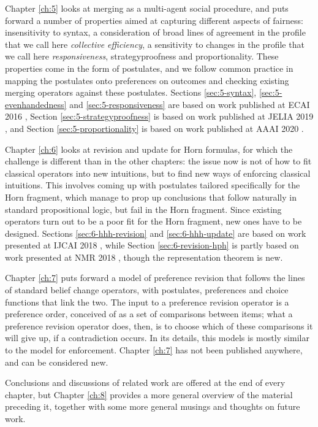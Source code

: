 Chapter \ref{ch:5} looks at merging as a multi-agent 
social procedure, and puts forward a number of properties
aimed at capturing different aspects of fairness:
insensitivity to syntax, 
a consideration of broad lines of agreement in the profile that we call here \emph{collective efficiency},
a sensitivity to changes in the profile that we call here \emph{responsiveness}, 
strategyproofness
and proportionality.
These properties come in the form of postulates, 
and we follow common practice in mapping the postulates 
onto preferences on outcomes and checking existing 
merging operators against these postulates.
Sections \ref{sec:5-syntax}, \ref{sec:5-evenhandedness} and \ref{sec:5-responsiveness}
are based on work published at ECAI 2016 \cite{HaretPW16}, 
Section \ref{sec:5-strategyproofness} is based on work published at JELIA 2019 \cite{HaretW19b},
and Section \ref{sec:5-proportionality} is based on work published at AAAI 2020 \cite{HaretLPW20}.

Chapter \ref{ch:6} looks at revision and update for Horn formulas,
for which the challenge is different than in the other chapters:
the issue now is not of how to fit classical operators into new intuitions,
but to find new ways of enforcing classical intuitions.
This involves coming up with postulates tailored specifically 
for the Horn fragment, which manage to prop up conclusions that 
follow naturally in standard propositional logic,
but fail in the Horn fragment.
Since existing operators turn out to be a poor fit 
for the Horn fragment, new ones have to be designed.
Sections \ref{sec:6-hhh-revision} and \ref{sec:6-hhh-update} 
are based on work presented 
at IJCAI 2018 \cite{CreignouHPW18},
while Section \ref{sec:6-revision-hph}
is partly based on work presented 
at NMR 2018 \cite{HaretW2018b}, 
though the representation theorem is new.

Chapter \ref{ch:7} puts forward a model of preference revision
that follows the lines of standard belief change operators,
with postulates, preferences and choice functions that 
link the two. The input to a preference revision operator 
is a preference order, conceived of as a set of comparisons 
between items; what a preference revision operator does, then,
is to choose which of these comparisons it will give up, 
if a contradiction occurs. In its details, this models is mostly 
similar to the model for enforcement.
Chapter \ref{ch:7} has not been published anywhere, and can be 
considered new.

Conclusions and discussions of related work are offered 
at the end of every chapter,
but Chapter \ref{ch:8} provides a more general overview of 
the material preceding it, together with some more general 
musings and thoughts on future work.

